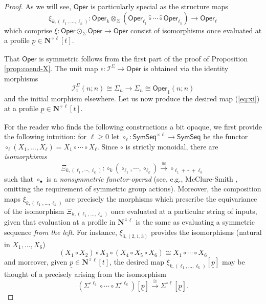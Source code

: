\documentclass[11pt]{amsart}
\theoremstyle{definition}
\theoremstyle{remark}
\newcommand{\SymSeq}{\mathsf{SymSeq}}
\newcommand{\Oper}{\mathsf{Oper}}
\newcommand{\Cal}[1]{\mathcal{#1}}
\newcommand{\Ncirc}[1]{\mathbf{N}^{\hat{\circ}#1}}
\newcommand{\circhat}{\hat{\circ}}
\newcommand{\circdot}{{\odot}}
\newcommand{\tensordot}{\dot{\otimes}}
\newcommand{\Isym}{\Cal{I}^{\Sigma}}
\begin{document}
\begin{proof} As we will see, $\Oper$ is particularly special as the structure maps \begin{equation} \label{eq:xi} 
    \xi_{k,(\ell_1,\dots,\ell_k)}\colon \Oper_{k} \tensordot_{\Sigma} (\Oper_{\ell_1} \circhat \cdots \circhat \Oper_{\ell_k}) \to \Oper_{\ell}
\end{equation} which comprise $\xi\colon \Oper \circdot_{\Sigma} \Oper \to \Oper$ consist of isomorphisms once evaluated at a profile $\underline{p}\in \Ncirc{\ell}[t]$. 

That $\Oper$ is symmetric follows from the first part of the proof of Proposition \ref{prop:coend-X}.  The unit map $\epsilon \colon \Isym \to \Oper$ is obtained via the identity morphisms \[ \Isym_1(n;n)\cong \Sigma_n \to \Sigma_n \cong \Oper_1(n;n) \] and the initial morphism elsewhere. Let us now produce the desired map (\ref{eq:xi}) at a profile $\underline{p}\in \Ncirc{\ell}[t]$. 

For the reader who finds the following constructions a bit opaque, we first provide the following intuition: for $\ell\geq 0$ let $\circ_{\ell} \colon \SymSeq^{\times \ell}\to \SymSeq$ be the functor $\circ_{\ell} (X_1,\dots,X_{\ell}) =X_1 \circ \cdots \circ X_{\ell}$. Since $\circ$ is strictly monoidal, there are \textit{isomorphisms} \begin{equation} \label{eq:Xi-fo} \Xi_{k,(\ell_1,\cdots,\ell_k)}\colon \circ_k (\circ_{\ell_1},\cdots, \circ_{\ell_k}) \xrightarrow{\cong} \circ_{\ell_1+\cdots+\ell_k}\end{equation} such that $\circ_{\bullet}$ is a \textit{nonsymmetric functor-operad} (see, e.g.,  McClure-Smith \cite[]{MS-box}, omitting the requirement of symmetric group actions). %
Moreover, the composition maps $\xi_{k,(\ell_1,\dots,\ell_k)}$ are precisely the morphisms which prescribe the equivariance of the isomorphism $\Xi_{k,(\ell_1,\dots,\ell_k)}$ once evaluated at a particular string of inputs, given that evaluation at a profile in $\Ncirc{\ell}$ is the same as evaluating a symmetric sequence \textit{from the left}. For instance, $\xi_{3,(2,1,3)}$ provides the isomorphisms (natural in $X_1,\dots,X_6$) \[ (X_1\circ X_2) \circ X_3 \circ (X_4\circ X_5 \circ X_6) \cong  X_1 \circ \cdots \circ X_6\] 
and moreover, given $\underline{p}\in\Ncirc{\ell}[t]$, the desired map $\xi_{k,(\ell_1,\dots,\ell_k)}[\underline{p}]$ may be thought of a precisely arising from the isomorphism \[ \left(\Sigma^{\circ \ell_1} \circ \cdots \circ \Sigma^{\circ \ell_k}\right)[\underline{p}]\xrightarrow{\cong}\Sigma^{\circ \ell} [\underline{p}].\]


\end{proof}
\end{document}
